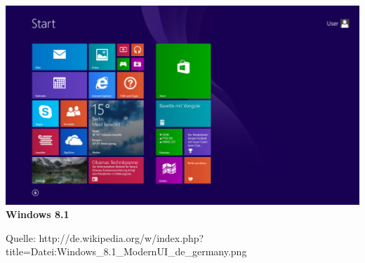 \documentclass[12pt,a4paper]{report}
\begin{document}
\begin{onehalfspace}
\begin{center}
\includegraphics[scale=0.35]{../docs/lyaton/graphics/Windows_8_1.png}\\
\textbf{Windows 8.1}\\
\begin{scriptsize}
Quelle: http://de.wikipedia.org/w/index.php?title=Datei:Windows\_8.1\_ModernUI\_de\_germany.png
\end{scriptsize}
\end{center}


\end{onehalfspace}
\end{document}

